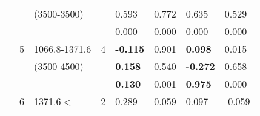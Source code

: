 \begin{table}[p]
\begin{tabular}{cclcllll}
                                                               &                                                                 & (3500-3500)                                                           &                                                                        & 0.593                                      & 0.772                                            & 0.635                                               & 0.529  \\ 
                                                               &                                                                 &                                                                                &                                                                        & 0.000                                      & 0.000                                            & 0.000                                               & 0.000  \\ \cline{5-8}\noalign{\smallskip}
                                                               & 5                                                              & 1066.8-1371.6                                                       & 4                                                                     & \textbf{-0.115 }                     & 0.901                                            & \textbf{0.098 }                               & 0.015  \\ 
                                                               &                                                                 & (3500-4500)                                                           &                                                                        & \textbf{0.158 }                       & 0.540                                            & \textbf{-0.272 }                             & 0.658  \\ 
                                                               &                                                                 &                                                                                &                                                                        & \textbf{0.130 }                       & 0.001                                            & \textbf{0.975 }                               & 0.000  \\ \cline{5-8}\noalign{\smallskip}
                                                               & 6                                                              & 1371.6$<$                                                             & 2                                                                     & 0.289                                       & 0.059                                            & 0.097                                              & -0.059  \\ 

\end{tabular}
\end{table}
